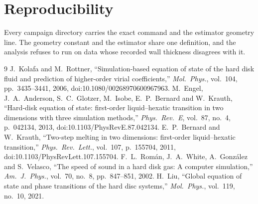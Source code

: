 \documentclass[journal]{IEEEtran}
\begin{document}
\section*{Reproducibility}
Every campaign directory carries the exact command and the estimator geometry line. The geometry
constant and the estimator share one definition, and the analysis refuses to run on data whose
recorded wall thickness disagrees with it.

\begin{thebibliography}{9}
 J.~Kolafa and M.~Rottner, ``Simulation-based equation of state of the hard disk
fluid and prediction of higher-order virial coefficients,'' \emph{Mol.\ Phys.}, vol.~104, pp.~3435--3441, 2006,
doi:10.1080/00268970600967963.
 M.~Engel, J.~A.~Anderson, S.~C.~Glotzer, M.~Isobe, E.~P.~Bernard and
W.~Krauth, ``Hard-disk equation of state: first-order liquid--hexatic transition in two dimensions
with three simulation methods,'' \emph{Phys.\ Rev.\ E}, vol.~87, no.~4, p.~042134, 2013,
doi:10.1103/PhysRevE.87.042134.
 E.~P.~Bernard and W.~Krauth, ``Two-step melting in two dimensions: first-order
liquid--hexatic transition,'' \emph{Phys.\ Rev.\ Lett.}, vol.~107, p.~155704, 2011,
doi:10.1103/PhysRevLett.107.155704.
 F.~L.~Rom\'an, J.~A.~White, A.~Gonz\'alez and S.~Velasco, ``The speed of sound
in a hard disk gas: A computer simulation,'' \emph{Am.\ J.\ Phys.}, vol.~70, no.~8, pp.~847--851,
2002.
 H.~Liu, ``Global equation of state and phase transitions of the hard disc
systems,'' \emph{Mol.\ Phys.}, vol.~119, no.~10, 2021.
\end{thebibliography}

\end{document}
